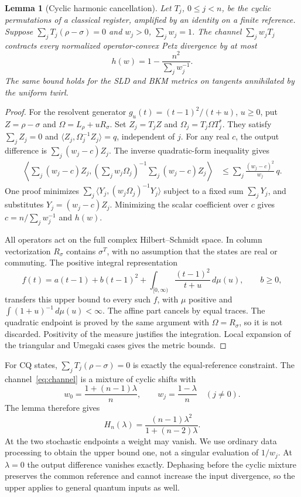 \documentclass[11pt]{article}
\newtheorem{lemma}[theorem]{Lemma}
\theoremstyle{remark}\newtheorem{remark}[theorem]{Remark}
\begin{document}
\begin{lemma}[Cyclic harmonic cancellation]\label{lem:harmonic}
Let $T_j$, $0\leq j<n$, be the cyclic permutations of a classical register, amplified by an identity on a finite reference. Suppose $\sum_jT_j(\rho-\sigma)=0$ and $w_j>0$, $\sum_jw_j=1$. The channel $\sum_jw_jT_j$ contracts every normalized operator-convex Petz divergence by at most
\[
 h(w)=1-\frac{n^2}{\sum_jw_j^{-1}}.
\]
The same bound holds for the SLD and BKM metrics on tangents annihilated by the uniform twirl.
\end{lemma}
\begin{proof}
For the resolvent generator $g_u(t)=(t-1)^2/(t+u)$, $u\geq0$, put $Z=\rho-\sigma$ and $\Omega=L_\rho+uR_\sigma$. Set $Z_j=T_jZ$ and $\Omega_j=T_j\Omega T_j^*$. They satisfy $\sum_jZ_j=0$ and $\langle Z_j,\Omega_j^{-1}Z_j\rangle=q$, independent of $j$. For any real $c$, the output difference is $\sum_j(w_j-c)Z_j$. The inverse quadratic-form inequality gives
\begin{align*}
 \left\langle\sum_j(w_j-c)Z_j,
 \left(\sum_jw_j\Omega_j\right)^{-1}
 \sum_j(w_j-c)Z_j\right\rangle
 &\leq\sum_j\frac{(w_j-c)^2}{w_j}\,q.
\end{align*}
One proof minimizes $\sum_j\langle Y_j,(w_j\Omega_j)^{-1}Y_j\rangle$ subject to a fixed sum $\sum_jY_j$, and substitutes $Y_j=(w_j-c)Z_j$. Minimizing the scalar coefficient over $c$ gives $c=n/\sum_jw_j^{-1}$ and $h(w)$.

All operators act on the full complex Hilbert--Schmidt space. In column vectorization $R_\sigma$ contains $\sigma^T$, with no assumption that the states are real or commuting. The positive integral representation~\cite{HR}
\[
 f(t)=a(t-1)+b(t-1)^2+
 \int_{[0,\infty)}\frac{(t-1)^2}{t+u}\,d\mu(u),\qquad b\geq0,
\]
transfers this upper bound to every such $f$, with $\mu$ positive and $\int(1+u)^{-1}\,d\mu(u)<\infty$. The affine part cancels by equal traces. The quadratic endpoint is proved by the same argument with $\Omega=R_\sigma$, so it is not discarded. Positivity of the measure justifies the integration. Local expansion of the triangular and Umegaki cases gives the metric bounds.
\end{proof}

For CQ states, $\sum_jT_j(\rho-\sigma)=0$ is exactly the equal-reference constraint. The channel~\eqref{eq:channel} is a mixture of cyclic shifts with
\[
 w_0=\frac{1+(n-1)\lambda}{n},\qquad
 w_j=\frac{1-\lambda}{n}\quad(j\ne0).
\]
The lemma therefore gives
\begin{equation}\label{eq:H}
 H_n(\lambda)=\frac{(n-1)\lambda^2}{1+(n-2)\lambda}.
\end{equation}
At the two stochastic endpoints a weight may vanish. We use ordinary data processing to obtain the upper bound one, not a singular evaluation of $1/w_j$. At $\lambda=0$ the output difference vanishes exactly. Dephasing before the cyclic mixture preserves the common reference and cannot increase the input divergence, so the upper applies to general quantum inputs as well.
\end{document}
